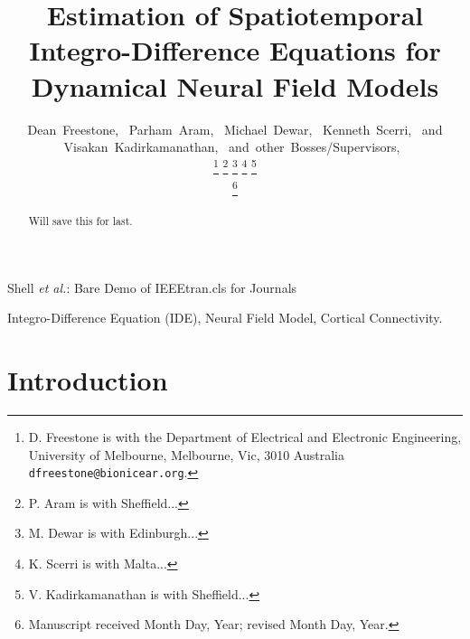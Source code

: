\documentclass[onecolumn,draftcls]{IEEEtran}
\begin{document}
\title{Estimation of Spatiotemporal Integro-Difference Equations for Dynamical Neural Field Models}

\author{Dean~Freestone,~
        Parham~Aram,~
        Michael~Dewar,~
        Kenneth~Scerri,~
        and Visakan~Kadirkamanathan,~
        and~other~Bosses/Supervisors,~%

\thanks{D. Freestone is with the Department
of Electrical and Electronic Engineering, University of Melbourne, Melbourne,
Vic, 3010 Australia {\tt\small dfreestone@bionicear.org}.}%
\thanks{P. Aram is with Sheffield...}
\thanks{M. Dewar is with Edinburgh...}
\thanks{K. Scerri is with Malta...}
\thanks{V. Kadirkamanathan is with Sheffield...}

\thanks{Manuscript received Month Day, Year; revised Month Day, Year.}}


%
{Shell \MakeLowercase{\textit{et al.}}: Bare Demo of IEEEtran.cls for Journals}

\maketitle

\begin{abstract}
Will save this for last.
\end{abstract}


\begin{IEEEkeywords}
Integro-Difference Equation (IDE), Neural Field Model, Cortical Connectivity.
\end{IEEEkeywords}

\IEEEpeerreviewmaketitle

\section{Introduction}
\end{document}
